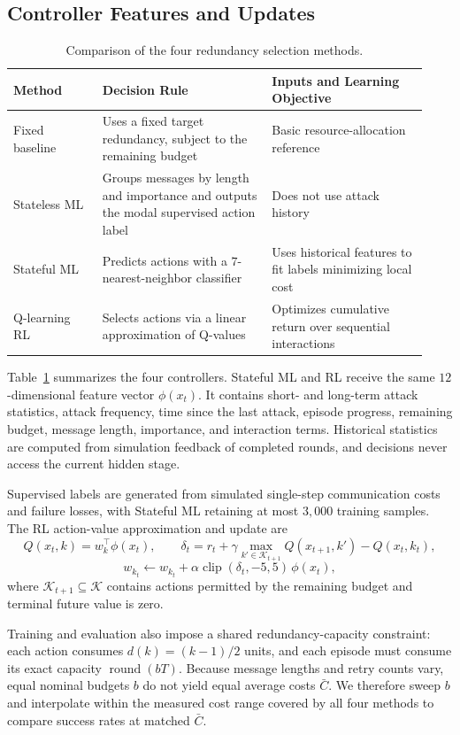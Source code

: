 \documentclass{article}
\begin{document}
\subsection{Controller Features and Updates}
\begin{table}[t]
\centering
\small
\caption{Comparison of the four redundancy selection methods.}
\label{tab:methods}
\begin{tabular}{@{}p{0.20\linewidth} p{0.38\linewidth} p{0.35\linewidth}@{}}
\toprule
\textbf{Method} & \textbf{Decision Rule} & \textbf{Inputs and Learning Objective} \\
\midrule
Fixed baseline & Uses a fixed target redundancy, subject to the remaining budget & Basic resource-allocation reference \\
Stateless {ML} & Groups messages by length and importance and outputs the modal supervised action label & Does not use attack history \\
Stateful {ML} & Predicts actions with a $7$-nearest-neighbor classifier & Uses historical features to fit labels minimizing local cost \\
Q-learning {RL} & Selects actions via a linear approximation of Q-values & Optimizes cumulative return over sequential interactions \\
\bottomrule
\end{tabular}
\end{table}

Table~\ref{tab:methods} summarizes the four controllers. Stateful {ML} and {RL} receive the same $12$-dimensional feature vector $\phi(x_t)$. It contains short- and long-term attack statistics, attack frequency, time since the last attack, episode progress, remaining budget, message length, importance, and interaction terms. Historical statistics are computed from simulation feedback of completed rounds, and decisions never access the current hidden stage.

Supervised labels are generated from simulated single-step communication costs and failure losses, with Stateful {ML} retaining at most $3{,}000$ training samples. The {RL} action-value approximation and update are
\[
Q(x_t, k) = w_k^\top \phi(x_t), \qquad
\delta_t = r_t + \gamma \max_{k' \in \mathcal{K}_{t+1}} Q(x_{t+1}, k') - Q(x_t, k_t),
\]
\[
w_{k_t} \leftarrow w_{k_t} + \alpha \operatorname{clip}(\delta_t, -5, 5)\,\phi(x_t),
\]
where $\mathcal{K}_{t+1} \subseteq \mathcal{K}$ contains actions permitted by the remaining budget and terminal future value is zero.

Training and evaluation also impose a shared redundancy-capacity constraint: each action consumes $d(k) = (k - 1)/2$ units, and each episode must consume its exact capacity $\operatorname{round}(bT)$. Because message lengths and retry counts vary, equal nominal budgets $b$ do not yield equal average costs $\bar{C}$. We therefore sweep $b$ and interpolate within the measured cost range covered by all four methods to compare success rates at matched $\bar{C}$.
\end{document}
